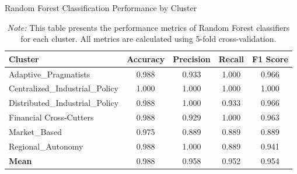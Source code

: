 \begin{table}[ht]
\centering
\caption{Random Forest Classification Performance by Cluster}
\label{tab:cluster_performance}
\begin{tabular}{l|cccc}
\hline
\textbf{Cluster} & \textbf{Accuracy} & \textbf{Precision} & \textbf{Recall} & \textbf{F1 Score} \\
\hline
Adaptive_Pragmatists & 0.988 & 0.933 & 1.000 & 0.966 \\
Centralized_Industrial_Policy & 1.000 & 1.000 & 1.000 & 1.000 \\
Distributed_Industrial_Policy  & 0.988 & 1.000 & 0.933 & 0.966 \\
Financial Cross-Cutters & 0.988 & 0.929 & 1.000 & 0.963 \\
Market_Based & 0.975 & 0.889 & 0.889 & 0.889 \\
Regional_Autonomy & 0.988 & 1.000 & 0.889 & 0.941 \\
\hline
\textbf{Mean} & 0.988 & 0.958 & 0.952 & 0.954 \\
\hline
\end{tabular}
\caption*{\small\textit{Note:} This table presents the performance metrics of Random Forest classifiers for each cluster. All metrics are calculated using 5-fold cross-validation.}
\end{table}